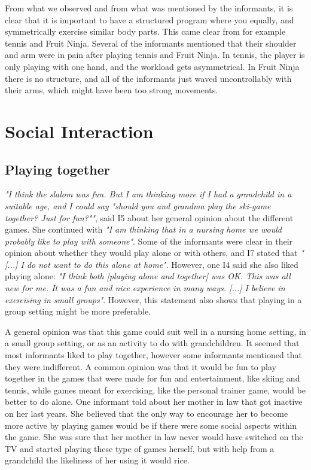 From what we observed and from what was mentioned by the informants, it is clear that it is important to have a structured program where you equally, and symmetrically exercise similar body parts. This came clear from for example tennis and Fruit Ninja. Several of the informants mentioned that their shoulder and arm were in pain after playing tennis and Fruit Ninja. In tennis, the player is only playing with one hand, and the workload gets asymmetrical. In Fruit Ninja there is no structure, and all of the informants just waved uncontrollably with their arms, which might have been too strong movements.
    
\section{Social Interaction}
\subsection{Playing together}
\emph{"I think the slalom was fun. But I am thinking more if I had a grandchild in a suitable age, and I could say "should you and grandma play the ski-game together? Just for fun?""}, said I5 about her general opinion about the different games. She continued with \emph{"I am thinking that in a nursing home we would probably like to play with someone"}. Some of the informants were clear in their opinion about whether they would play alone or with others, and I7 stated that \emph{"[...] I do not want to do this alone at home"}. However, one I4 said she also liked playing alone: \emph{"I think both [playing alone and together] was OK. This was all new for me. It was a fun and nice experience in many ways. [...] I believe in  exercising in small groups"}. However, this statement also shows that playing in a group setting might be more preferable.  

A general opinion was that this game could suit well in a nursing home setting, in a small group setting, or as an activity to do with grandchildren. It seemed that most informants liked to play together, however some informants mentioned that they were indifferent. A common opinion was that it would be fun to play together in the games that were made for fun and entertainment, like skiing and tennis, while games meant for exercising, like the personal trainer game, would be better to do alone. One informant told about her mother in law that got inactive on her last years. She believed that the only way to encourage her to become more active by playing games would be if there were some social aspects within the game. She was sure that her mother in law never would have switched on the TV and started playing these type of games herself, but with help from a grandchild the likeliness of her using it would rice. 

